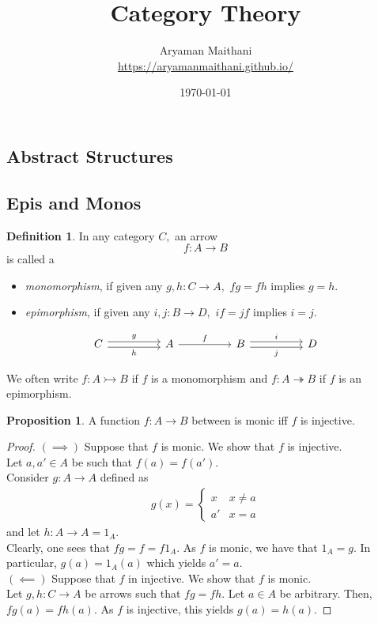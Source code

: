 \documentclass[11pt,leqno,landscape,semhelv]{seminar}
\title{\vspace{1cm} Category Theory}
\author{Aryaman Maithani\\\url{https://aryamanmaithani.github.io/}}
\date{\today}
\numberwithin{equation}{section}
\theoremstyle{definition}
\newtheorem{prop}[thm]{Proposition}
\newtheorem{defn}[thm]{Definition}
\numberwithin{thm}{section}
\numberwithin{equation}{section}
\renewcommand{\sec}[1]{%
\begin{slide}
\begin{center}
    \begin{center}
        \section{#1}
    \end{center}
\end{center}
\end{slide}}
\newcommand{\mono}{\rightarrowtail}
\newcommand{\epi}{\twoheadrightarrow}
\begin{document}
\maketitle
\newpage
\setcounter{section}{-2}
\tableofcontents



%
%
%
\sec{Abstract Structures}
\subsection{Epis and Monos}
\begin{defn} 
	In any category $C,$ an arrow
	\begin{equation*} 
		f:A\to B
	\end{equation*}
	is called a 
	\begin{itemize}
		\item \emph{monomorphism}, if given any $g, h:C\to A,$ $fg = fh$ implies $g = h.$
		\item \emph{epimorphism}, if given any $i, j:B\to D,$ $if = jf$ implies $i = j.$
	\end{itemize}
	\begin{equation*} 
		\begin{tikzcd}
		C \arrow[rr, "h"', shift right] \arrow[rr, "g", shift left] &  & A \arrow[rr, "f"] &  & B \arrow[rr, "i", shift left] \arrow[rr, "j"', shift right] &  & D
		\end{tikzcd}
	\end{equation*}
\end{defn}	
We often write $f:A\mono B$ if $f$ is a monomorphism and $f:A \epi B$ if $f$ is an epimorphism.
\begin{prop} \label{prop:monin}
	A function $f:A\to B$ between is monic iff $f$ is injective.
\end{prop}
\begin{proof} 
	$(\implies)$ Suppose that $f$ is monic. We show that $f$ is injective. \\
	Let $a, a' \in A$ be such that $f(a) = f(a').$\\
	Consider $g:A \to A$ defined as
	\begin{align*} 
		g(x) = \begin{cases}
			x & x \neq a\\
			a' & x = a
		\end{cases}
	\end{align*}
	and let $h:A \to A = 1_A.$\\
	Clearly, one sees that $fg = f = f1_A.$ As $f$ is monic, we have that $1_A = g.$ In particular, $g(a) = 1_A(a)$ which yields $a' = a.$\\
	$(\impliedby)$ Suppose that $f$ in injective. We show that $f$ is monic.\\
	Let $g, h:C\to A$ be arrows such that $fg = fh.$ Let $a \in A$ be arbitrary. Then, $fg(a) = fh(a).$ As $f$ is injective, this yields $g(a) = h(a).$
\end{proof}
\end{document}
